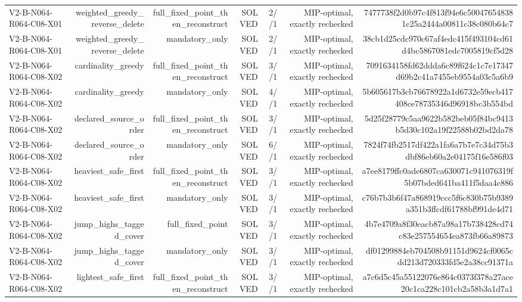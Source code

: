 {\begin{longtable}{lrrrrrr}
V2-B-N064-R064-C08-X01 & weighted\_greedy\_reverse\_delete & full\_fixed\_point\_then\_reconstruct & SOLVED & 2//1 & MIP-optimal, exactly rechecked & 7477738f2d0b97c4f813f94e6c500476548381c25a2444a00811c38c080b64c7 \\
V2-B-N064-R064-C08-X01 & weighted\_greedy\_reverse\_delete & mandatory\_only & SOLVED & 2//1 & MIP-optimal, exactly rechecked & 38cb1d25cdc970c67af4edc415f493104cd61d4bc5867081edc7005819cf5d28 \\
V2-B-N064-R064-C08-X02 & cardinality\_greedy & full\_fixed\_point\_then\_reconstruct & SOLVED & 3//1 & MIP-optimal, exactly rechecked & 7091634158fd62ddda6c89f624c1c7e17347d69b2c41a7455eb9554a03c5a6b9 \\
V2-B-N064-R064-C08-X02 & cardinality\_greedy & mandatory\_only & SOLVED & 4//1 & MIP-optimal, exactly rechecked & 5b605617b3cb76678922a1d6732e59ecb417408ce78735346d96918bc3b554bd \\
V2-B-N064-R064-C08-X02 & declared\_source\_order & full\_fixed\_point\_then\_reconstruct & SOLVED & 3//1 & MIP-optimal, exactly rechecked & 5d25f28779c5aa9622b582beb05f84bc9413b5d30c102a19f22588b02bd2da78 \\
V2-B-N064-R064-C08-X02 & declared\_source\_order & mandatory\_only & SOLVED & 6//1 & MIP-optimal, exactly rechecked & 7824f74fb2517df422a1fa6a7b7e7c34d75b3dbf86eb60a2e04175f16e586f03 \\
V2-B-N064-R064-C08-X02 & heaviest\_safe\_first & full\_fixed\_point\_then\_reconstruct & SOLVED & 3//1 & MIP-optimal, exactly rechecked & a7ee8179ffc0ade6807ca630071c941076319f5b07bded641ba411f5daa4c886 \\
V2-B-N064-R064-C08-X02 & heaviest\_safe\_first & mandatory\_only & SOLVED & 3//1 & MIP-optimal, exactly rechecked & c76b7b3b6f47a868919ccc5f6c830b75b9389a351b3ffcdf61788bf991de4d71 \\
V2-B-N064-R064-C08-X02 & jump\_highs\_tagged\_cover & full\_fixed\_point & SOLVED & 3//1 & MIP-optimal, exactly rechecked & 4b7e4709a8f30eacb87a98a17b738428cd74c83e257554654ea873fb66a89873 \\
V2-B-N064-R064-C08-X02 & jump\_highs\_tagged\_cover & mandatory\_only & SOLVED & 3//1 & MIP-optimal, exactly rechecked & df01299884eb704508b91151d9624cf0065cdd213d720333fd5e2a38cc91371a \\
V2-B-N064-R064-C08-X02 & lightest\_safe\_first & full\_fixed\_point\_then\_reconstruct & SOLVED & 3//1 & MIP-optimal, exactly rechecked & a7c6d5c45a55122076e864c0373f378a27ace20c1ca228c101cb2a58b3a1d7a1 \\

\end{longtable}}
